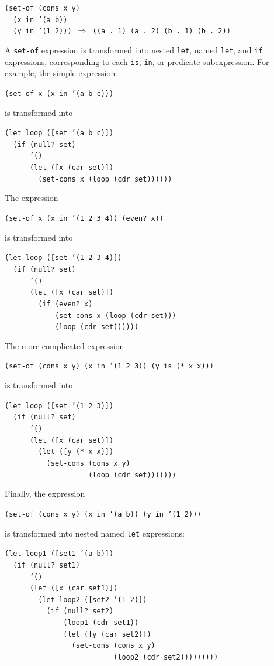 \begin{alltt}
(set-of (cons x y)
  (x in '(a b))
  (y in '(1 2))) \(\Rightarrow\) ((a . 1) (a . 2) (b . 1) (b . 2))
\end{alltt}


A \texttt{set-of} expression is transformed into nested \texttt{let}, named \texttt{let},
and \texttt{if} expressions, corresponding to each \texttt{is}, \texttt{in}, or predicate
subexpression.
For example, the simple expression


\texttt{(set-of x (x in '(a b c)))}

is transformed into


\begin{alltt}
(let loop ([set '(a b c)])
  (if (null? set)
      '()
      (let ([x (car set)])
        (set-cons x (loop (cdr set))))))
\end{alltt}


The expression


\texttt{(set-of x (x in '(1 2 3 4)) (even? x))}

is transformed into


\begin{alltt}
(let loop ([set '(1 2 3 4)])
  (if (null? set)
      '()
      (let ([x (car set)])
        (if (even? x)
            (set-cons x (loop (cdr set)))
            (loop (cdr set))))))
\end{alltt}


The more complicated expression


\texttt{(set-of (cons x y) (x in '(1 2 3)) (y is (* x x)))}

is transformed into


\begin{alltt}
(let loop ([set '(1 2 3)])
  (if (null? set)
      '()
      (let ([x (car set)])
        (let ([y (* x x)])
          (set-cons (cons x y)
                    (loop (cdr set)))))))
\end{alltt}


Finally, the expression


\texttt{(set-of (cons x y) (x in '(a b)) (y in '(1 2)))}

is transformed into nested named \texttt{let} expressions:


\begin{alltt}
(let loop1 ([set1 '(a b)])
  (if (null? set1)
      '()
      (let ([x (car set1)])
        (let loop2 ([set2 '(1 2)])
          (if (null? set2)
              (loop1 (cdr set1))
              (let ([y (car set2)])
                (set-cons (cons x y)
                          (loop2 (cdr set2)))))))))
\end{alltt}


